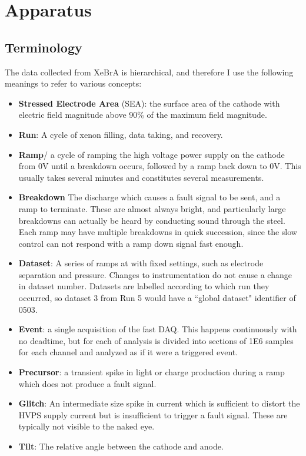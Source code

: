 \section{Apparatus}
\subsection{Terminology}
The data collected from XeBrA is hierarchical, and therefore I use the following meanings to refer to various concepts:
\begin{itemize}
    \item \textbf{Stressed Electrode Area} (SEA): the surface area of the cathode with electric field magnitude above 90\% of the maximum field magnitude.
    \item \textbf{Run}: A cycle of xenon filling, data taking, and recovery.
    \item \textbf{Ramp}/ a cycle of ramping the high voltage power supply on the cathode from 0V until a breakdown occurs, followed by a ramp back down to 0V.
    This usually takes several minutes and constitutes several measurements.
    \item \textbf{Breakdown} The discharge which causes a fault signal to be sent, and a ramp to terminate.
    These are almost always bright, and particularly large breakdowns can actually be heard by conducting sound through the steel.
    Each ramp may have multiple breakdowns in quick succession, since the slow control can not respond with a ramp down signal fast enough.
    \item \textbf{Dataset}: A series of ramps at with fixed settings, such as electrode separation and pressure.
    Changes to instrumentation do not cause a change in dataset number. 
    Datasets are labelled according to which run they occurred, so dataset 3 from Run 5 would have a ``global dataset" identifier of 0503.
    \item \textbf{Event}: a single acquisition of the fast DAQ. This happens continuously with no deadtime, but for each of analysis is divided into sections of 1E6 samples for each channel and analyzed as if it were a triggered event.
    \item \textbf{Precursor}: a transient spike in light or charge production during a ramp which does not produce a fault signal.
    \item \textbf{Glitch}: An intermediate size spike in current which is sufficient to distort the HVPS supply current but is insufficient to trigger a fault signal. These are typically not visible to the naked eye.
    \item \textbf{Tilt}: The relative angle between the cathode and anode.
    
\end{itemize}
